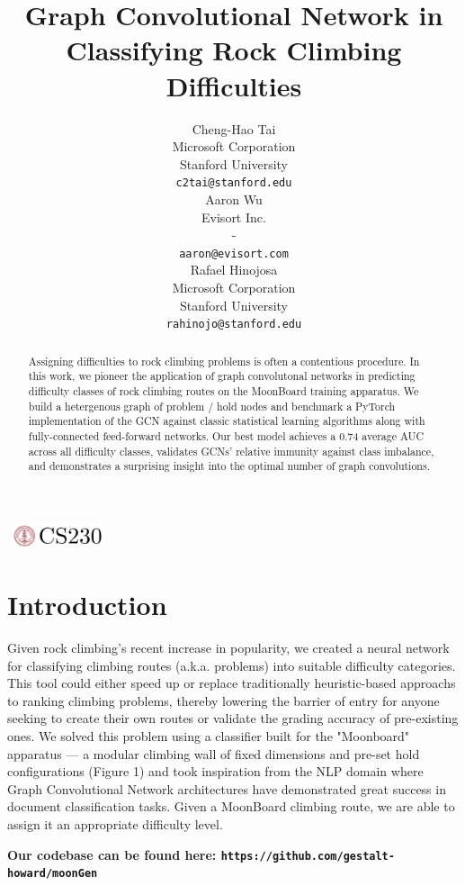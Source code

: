 \documentclass{article}
\title{Graph Convolutional Network in Classifying Rock Climbing Difficulties}
\author{
  Cheng-Hao Tai \\
  Microsoft Corporation \\
  Stanford University \\
  \texttt{c2tai@stanford.edu} \\
  \And
  Aaron Wu \\
  Evisort Inc. \\
  - \\
  \texttt{aaron@evisort.com} \\
  \And
  Rafael Hinojosa \\
  Microsoft Corporation \\
  Stanford University \\
  \texttt{rahinojo@stanford.edu} \\
}
\begin{document}
\begin{center}
\includegraphics[width=3cm, height=0.7cm]{CS230}
\end{center}

\maketitle

\begin{abstract}
Assigning difficulties to rock climbing problems is often a contentious procedure. In this work, we pioneer the application of graph convolutonal networks in predicting difficulty classes of rock climbing routes on the MoonBoard training apparatus. We build a hetergenous graph of problem / hold nodes and benchmark a PyTorch implementation of the GCN against classic statistical learning algorithms along with fully-connected feed-forward networks. Our best model achieves a 0.74 average AUC across all difficulty classes, validates GCNs' relative immunity against class imbalance, and demonstrates a surprising insight into the optimal number of graph convolutions. 
\end{abstract}

\section{Introduction}	
Given rock climbing's recent increase in popularity, we created a neural network for classifying climbing routes (a.k.a. problems) into suitable difficulty categories. This tool could either speed up or replace traditionally heuristic-based approachs to ranking climbing problems, thereby lowering the barrier of entry for anyone seeking to create their own routes or validate the grading accuracy of pre-existing ones. We solved this problem using a classifier built for the "Moonboard" apparatus --- a modular climbing wall of fixed dimensions and pre-set hold configurations (Figure 1) and took inspiration from the NLP domain where Graph Convolutional Network architectures have demonstrated great success in document classification tasks. Given a MoonBoard climbing route, we are able to assign it an appropriate difficulty level.

{\small\textbf{Our codebase can be found here: \texttt{https://github.com/gestalt-howard/moonGen}}}
\end{document}
